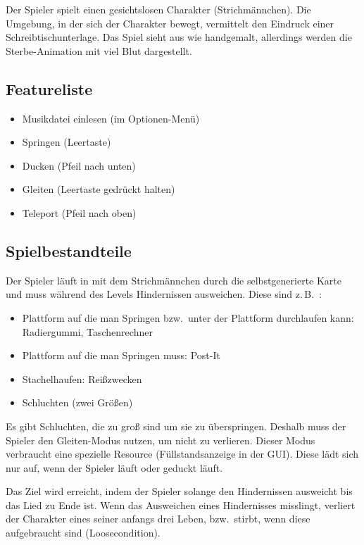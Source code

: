 \documentclass[Skript.tex]{subfiles}
\begin{document}
Der Spieler spielt einen gesichtslosen Charakter (Strichmännchen). 
Die Umgebung, in der sich der Charakter bewegt, vermittelt den Eindruck einer Schreibtischunterlage. 
Das Spiel sieht aus wie handgemalt, allerdings werden die Sterbe-Animation mit viel Blut dargestellt.




\subsection{Featureliste}

\begin{itemize}
\item Musikdatei einlesen (im Optionen-Menü)
\item Springen (Leertaste)
\item Ducken  (Pfeil nach unten)
\item Gleiten (Leertaste gedrückt halten)
\item Teleport (Pfeil nach oben)
\end{itemize}


\subsection{Spielbestandteile}

Der Spieler läuft  in \gname mit dem Strichmännchen durch die selbstgenerierte Karte und muss während des Levels Hindernissen ausweichen. Diese sind z.\,B.\ :

\begin{itemize}
\item Plattform auf die man Springen bzw.\ unter der Plattform durchlaufen kann: Radiergummi, Taschenrechner
\item Plattform auf die man Springen muss: Post-It
\item Stachelhaufen: Reißzwecken
\item Schluchten (zwei Größen)
\end{itemize}

Es gibt Schluchten, die zu groß sind um sie zu überspringen. 
Deshalb muss der Spieler den Gleiten-Modus nutzen, um nicht zu verlieren. 
Dieser Modus verbraucht eine spezielle Resource (Füllstandsanzeige in der GUI).
Diese lädt sich nur auf, wenn der Spieler läuft oder geduckt läuft.

Das Ziel wird erreicht, indem der Spieler solange den Hindernissen ausweicht bis das Lied zu Ende ist.
Wenn das Ausweichen eines Hindernisses misslingt, verliert der Charakter eines seiner anfangs drei Leben, bzw.\ stirbt, wenn diese aufgebraucht sind (Loosecondition).  
\end{document}
